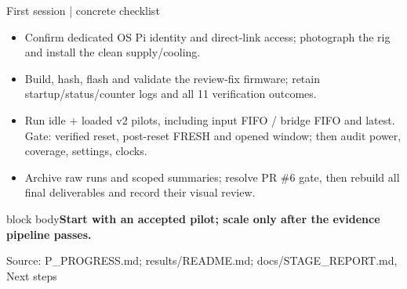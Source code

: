 \documentclass[aspectratio=169,12pt,t]{beamer}
\newcommand{\src}[1]{\par\vfill{\small\color{muted}Source: #1}}
\newcommand{\takeaway}[1]{\par\medskip\begin{beamercolorbox}[sep=2mm,wd=\linewidth]{block body}\color{navy}\textbf{#1}\end{beamercolorbox}}
\begin{document}
\begin{frame}{First session | concrete checklist}
\begin{itemize}
\item Confirm dedicated OS Pi identity and direct-link access; photograph the rig and install the clean supply/cooling.
\item Build, hash, flash and validate the review-fix firmware; retain startup/status/counter logs and all 11 verification outcomes.
\item Run idle + loaded v2 pilots, including input FIFO / bridge FIFO and latest. Gate: verified reset, post-reset FRESH and opened window; then audit power, coverage, settings, clocks.
\item Archive raw runs and scoped summaries; resolve PR \#6 gate, then rebuild all final deliverables and record their visual review.
\end{itemize}
\takeaway{Start with an accepted pilot; scale only after the evidence pipeline passes.}\src{P\_PROGRESS.md; results/README.md; docs/STAGE\_REPORT.md, Next steps}
\end{frame}
\end{document}
